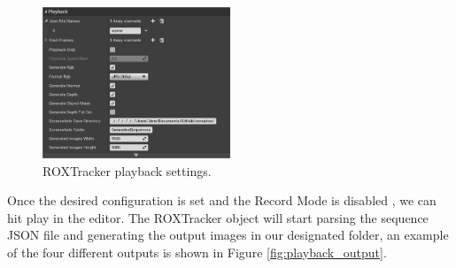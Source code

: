 \begin{figure}[h]
	\includegraphics[width=0.5\textwidth]{archivos/playback_settings.png}
	\centering
	\caption{ROXTracker playback settings.}
	\label{fig:playback_settings}
\end{figure}

Once the desired configuration is set and the Record Mode is disabled , we can hit play in the editor. The ROXTracker object will start parsing the sequence JSON file and generating the output images in our designated folder, an example of the four different outputs is shown in Figure \ref{fig:playback_output}.

